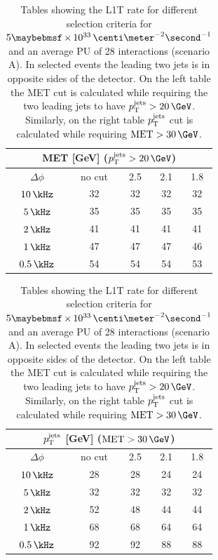 \begin{table}[!htb]
\begin{minipage}{.5\linewidth}
  \centering
  \begin{tabular}{|c||c|c|c|c|}
  \hline
  \multicolumn{5}{|c|}{MET [GeV] ($\pt^{\text{jets}} > 20\,\GeV$)} \\
  \hline\hline
  $\Delta\phi$ & no cut & 2.5 & 2.1 & 1.8 \\
  \hline
   $10\,\kHz$  &     32 &  32 &  32 &  32 \\
    $5\,\kHz$  &     35 &  35 &  35 &  35 \\
  \hline\hline
    $2\,\kHz$  &     41 &  41 &  41 &  41 \\
  \hline\hline
    $1\,\kHz$  &     47 &  47 &  47 &  46 \\
  $0.5\,\kHz$  &     54 &  54 &  54 &  53 \\
  \hline
  \end{tabular}
\end{minipage}%
\begin{minipage}{.5\linewidth}
  \centering
  \begin{tabular}{|c||c|c|c|c|}
  \hline
  \multicolumn{5}{|c|}{$p_{\mathrm{T}}^{\text{jets}}$ [GeV] ($\text{MET}>30\,\GeV$)} \\
  \hline
  $\Delta\phi$ & no cut & 2.5 & 2.1 & 1.8 \\
  \hline\hline
   $10\,\kHz$  &     28 &  28 &  24 &  24 \\
    $5\,\kHz$  &     32 &  32 &  32 &  32 \\
  \hline\hline
    $2\,\kHz$  &     52 &  48 &  44 &  44 \\
  \hline\hline
    $1\,\kHz$  &     68 &  68 &  64 &  64 \\
  $0.5\,\kHz$  &     92 &  92 &  88 &  88 \\
  \hline
  \end{tabular}
\end{minipage} 
\caption{Tables showing the \gls{L1T} rate for different selection criteria for $5 \times 10^{33}\,\centi\meter^{-2}\second^{-1}$ and an average \gls{PU} of 28 interactions (scenario A). In selected events the leading two jets is in opposite sides of the detector. On the left table the \gls{MET} cut is calculated while requiring the two leading jets to have $\pt^{\text{jets}} > 20\,\GeV$. Similarly, on the right table $p_{\mathrm{T}}^{\text{jets}}$ cut is calculated while requiring $\text{MET}>30\,\GeV$.}
\label{TABLE:ParkedDataAnalysis_L1TParkedTriggerDevelopment_Rate5E33}
\end{table}

